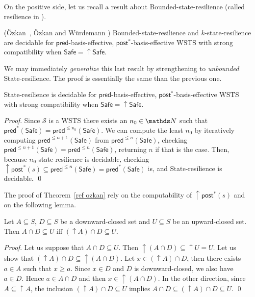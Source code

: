 \documentclass[runningheads]{llncs}
\newcommand{\pred}{\textsf{pred}}
\newcommand{\post}{\textsf{post}}
\newcommand{\Safe}{\textsf{Safe}}
\begin{document}
On the positive side, let us recall a result about {\sc Bounded-state-resilience} (called resilience in \cite{DBLP:conf/gg/Ozkan22,DBLP:journals/corr/abs-2108-00889}).
%
\begin{theorem}\label{ref ozkan}
(\"Ozkan~\cite{DBLP:conf/gg/Ozkan22}, \"Ozkan and W{\"{u}}rdemann \cite{DBLP:journals/corr/abs-2108-00889})
{\sc Bounded-state-resilience} and {\sc $k$-state-resilience} are decidable for $\pred$-basis-effective, $\post^*$-basis-effective WSTS with strong compatibility
when
$\Safe=\mathop{\uparrow} \Safe$.
\end{theorem}

We may immediately  \emph{generalize} this last result by strengthening to \emph{unbounded} {\sc State-resilience}. The proof is essentially the same than the previous one.

\begin{proposition}\label{postcomputable}
{\sc State-resilience} is decidable for $\pred$-basis-effective, $\post^*$-basis-effective WSTS with strong compatibility
when
$\Safe=\mathop{\uparrow} \Safe$.
\end{proposition}

\begin{proof}
Since $\mathscr{S}$ is a WSTS there exists an $n_0 \in \N$ such that
$\pred^*(\Safe) =  \pred^{\leq n_0}(\Safe)$. We can compute the least $n_0$ by iteratively computing 
$\pred^{\leq n+1}(\Safe)$ from $\pred^{\leq n}(\Safe)$, checking 
$\pred^{\leq n+1}(\Safe) = \pred^{\leq n}(\Safe)$, 
returning $n$ if that is the case.
Then, because {\sc $n_0$-state-resilience} is decidable, 
checking $\mathop{\uparrow} \post^*(s) 
 \subseteq \pred^{\leq n}(\Safe) = \pred^*(\Safe)$ is,
and {\sc State-resilience} is decidable. \qed
\end{proof}

The proof of Theorem~\ref{ref ozkan} rely on the computability of $\mathop{\uparrow} \post^*(s)$ and on the following lemma.

\begin{lemma}\label{Lemma intersection}
Let $A \subseteq S$, $D \subseteq S$ be a downward-closed set and $U \subseteq S$ be an upward-closed set. 
Then $A \cap D \subseteq U$  iff $ (\mathop{\uparrow}  A) \cap D \subseteq U$.
\end{lemma}


\begin{proof}
Let us suppose that $A \cap D \subseteq U$. Then ${\mathop{\uparrow} (A \cap D)} \subseteq {\mathop{\uparrow} U} = U$.
Let us show that $({\mathop{\uparrow} A}) \cap D \subseteq {\mathop{\uparrow} (A \cap D)}$.
Let $x \in ({\mathop{\uparrow} A}) \cap D$, then there exists $a \in A$ such that $x \geq a$.
Since $x \in D$ and $D$ is downward-closed, we also have $a \in D$.
Hence $a \in A \cap D$ and then $x \in { \mathop{\uparrow} (A \cap D)}$.
In the other direction,
since $A \subseteq {\mathop{\uparrow} A}$, the inclusion
$({\mathop{\uparrow}  A}) \cap D \subseteq U$ implies
$A \cap D \subseteq ({\mathop{\uparrow}  A}) \cap D \subseteq U$. \qed
\end{proof}
\end{document}
